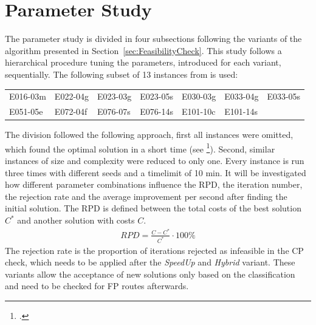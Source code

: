 \section{Parameter Study}
\label{sec:parameter_study}

The parameter study is divided in four subsections following the variants of the algorithm
presented in Section~\ref{sec:FeasibilityCheck}. This study follows a hierarchical procedure
tuning the parameters, introduced for each variant, sequentially. The following subset of 13
instances from \gendreauDataSetText is used:


\begin{table}[ht]
	\centering
	\setlength{\tabcolsep}{0.75em}
	\def\arraystretch{1.5}
	\begin{tabular}{lllllll}
		E016-03m & E022-04g & E023-03g & E023-05s & E030-03g & E033-04g & E033-05s \\
		E051-05e & E072-04f & E076-07s & E076-14s & E101-10c & E101-14s &          \\
	\end{tabular}
\end{table}

The division followed the following approach, first all instances were omitted, which found
the optimal solution in a short time (see \cite{tamke_branch-and-cut_2024}\footcite[cf.][p.26]{tamke_branch-and-cut_2024}).
Second, similar instances of size and complexity were reduced to only one.
Every instance is run three times with different seeds and a timelimit of 10 min. It will be investigated
how different parameter combinations influence the \gls{RPD}, the iteration number, the rejection rate and
the average improvement per second after finding the initial solution. The \gls{RPD} is defined between the
total costs of the best solution $C^*$ and another solution with costs $C$.
\begin{align}
	RPD = \frac{C - C^*}{C^*} \cdot 100\%
\end{align}
The rejection rate is the proportion of iterations rejected as infeasible in the \gls{CP} check, which needs
to be applied after the \textit{SpeedUp} and \textit{Hybrid} variant. These variants allow the acceptance of
new solutions only based on the classification and need to be checked for \gls{FP} routes afterwards.

